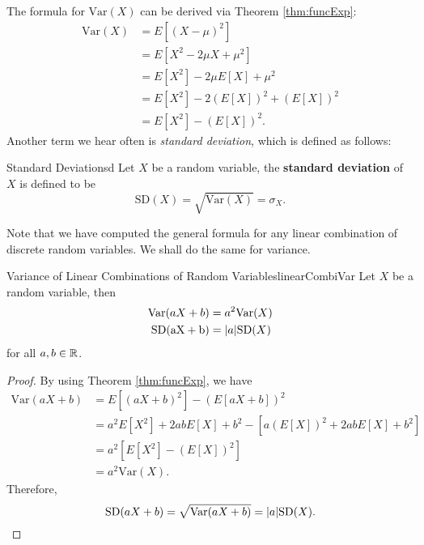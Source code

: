 \documentclass[math]{amznotes}
\theoremstyle{remark}
\begin{document}
The formula for $\mathrm{Var}(X)$ can be derived via Theorem \ref{thm:funcExp}:
\begin{align*}
    \mathrm{Var}(X) & = E[(X - \mu)^2] \\
    & = E[X^2 - 2\mu X + \mu^2] \\
    & = E[X^2] - 2\mu E[X] + \mu^2 \\
    & = E[X^2] - 2(E[X])^2 + (E[X])^2 \\
    & = E[X^2] - (E[X])^2.
\end{align*}
Another term we hear often is \textit{standard deviation}, which is defined as follows:
\begin{dfnbox}{Standard Deviation}{sd}
    Let $X$ be a random variable, the {\color{red} \textbf{standard deviation}} of $X$ is defined to be
    \begin{equation*}
        \mathrm{SD}(X) = \sqrt{\mathrm{Var}(X)} = \sigma_X.
    \end{equation*}
\end{dfnbox}
Note that we have computed the general formula for any linear combination of discrete random variables. We shall do the same for variance.
\begin{probox}{Variance of Linear Combinations of Random Variables}{linearCombiVar}
    Let $X$ be a random variable, then
    \begin{align*}
        \mathrm{Var}(aX + b) & = a^2\mathrm{Var}(X) \\
        \mathrm{SD(aX + b)} & ={\left\lvert {a} \right\rvert}\mathrm{SD}(X)
    \end{align*}
    for all $a, b \in \mathbb{R}$.
    \tcblower
    \begin{proof}
        By using Theorem \ref{thm:funcExp}, we have
        \begin{align*}
            \mathrm{Var}(aX + b) & = E[(aX + b)^2] - (E[aX + b])^2 \\
            & = a^2 E[X^2] + 2ab E[X] + b^2 - \left[a(E[X])^2 + 2abE[X] + b^2\right] \\
            & = a^2\left[E[X^2] - (E[X])^2\right] \\
            & = a^2\mathrm{Var}(X).
        \end{align*}
        Therefore,
        \begin{equation*}
            \mathrm{SD}(aX + b) = \sqrt{\mathrm{Var}(aX + b)} = {\left\lvert {a} \right\rvert}\mathrm{SD}(X).
        \end{equation*}
    \end{proof}
\end{probox}
\end{document}
